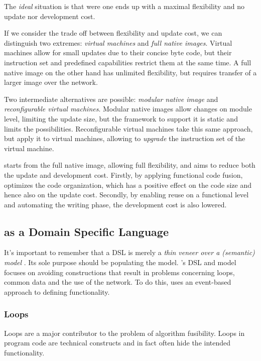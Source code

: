 \documentclass[conference]{IEEEtran}
\begin{document}
The \emph{ideal} situation is that were one ends up with a maximal flexibility
and no update nor development cost.

If we consider the trade off between flexibility and update cost, we can
distinguish two extremes: \emph{virtual machines} and \emph{full native
images}. Virtual machines allow for small updates due to their concise byte
code, but their instruction set and predefined capabilities restrict them at
the same time. A full native image on the other hand has unlimited flexibility,
but requires transfer of a larger image over the network.

Two intermediate alternatives are possible: \emph{modular native image} and
\emph{reconfigurable virtual machines}. Modular native images allow changes on
module level, limiting the update size, but the framework to support it is
static and limits the possibilities. Reconfigurable virtual machines take this
same approach, but apply it to virtual machines, allowing to \emph{upgrade} the
instruction set of the virtual machine.

\NAME starts from the full native image, allowing full flexibility, and aims to
reduce both the update and development cost. Firstly, by applying functional
code fusion, \NAME optimizes the code organization, which has a positive effect
on the code size and hence also on the update cost. Secondly, by enabling reuse
on a functional level and automating the writing phase, the development cost is
also lowered.

\subsection{\NAME as a Domain Specific Language}
\label{dsl-design}

It's important to remember that a DSL is merely a \emph{thin veneer over a
(semantic) model} \cite{fowler2010domain}. Its sole purpose should be
populating the model. \NAME's DSL and model focuses on avoiding constructions
that result in problems concerning loops, common data and the use of the
network. To do this, \NAME uses an event-based approach to defining
functionality.

\subsubsection{Loops}

Loops are a major contributor to the problem of algorithm fusibility. Loops in
program code are technical constructs and in fact often hide the intended
functionality.
\end{document}
